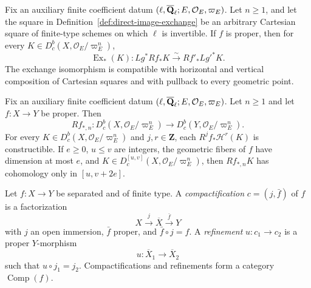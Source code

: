 
\begin{proposition}
\label{prop:finite-proper-base-change}


Fix an auxiliary finite coefficient datum
\((\ell,\overline{\mathbf Q}_\ell;E,\mathcal O_E,\varpi_E)\).  Let \(n\geq1\), and let the square in
Definition~\ref{def:direct-image-exchange} be an arbitrary Cartesian
square of finite-type schemes on which \(\ell\) is invertible.  If \(f\) is
proper, then for every
\(K\in D^b_c(X,\mathcal O_E/\varpi_E^n)\),
\[
 \operatorname{Ex}_*(K):Lg^*Rf_*K\xrightarrow{\sim}Rf'_*Lg'^*K.
\]
The exchange isomorphism is compatible with horizontal and vertical
composition of Cartesian squares and with pullback to every geometric
point.
\end{proposition}


\begin{proposition}
\label{prop:finite-proper-direct-image}


Fix an auxiliary finite coefficient datum
\((\ell,\overline{\mathbf Q}_\ell;E,\mathcal O_E,\varpi_E)\).  Let \(n\geq1\) and let
\(f:X\to Y\) be proper.  Then
\[
 Rf_{*,n}:D^b_c(X,\mathcal O_E/\varpi_E^n)
 \longrightarrow D^b_c(Y,\mathcal O_E/\varpi_E^n).
\]
For every \(K\in D^b_c(X,\mathcal O_E/\varpi_E^n)\) and
\(j,r\in\mathbf Z\), each \(R^jf_*\mathcal H^r(K)\) is constructible.  If
\(e\geq0\), \(u\leq v\) are integers, the geometric fibers of \(f\) have
dimension at most \(e\), and
\(K\in D_c^{[u,v]}(X,\mathcal O_E/\varpi_E^n)\), then
\(Rf_{*,n}K\) has cohomology only in \([u,v+2e]\).
\end{proposition}


\begin{definition}
\label{def:compactification-category}


Let \(f:X\to Y\) be separated and of finite type.  A
\emph{compactification} \(c=(j,\bar f)\) of \(f\) is a factorization
\[
 X\xrightarrow{j}\overline X\xrightarrow{\bar f}Y
\]
with \(j\) an open immersion, \(\bar f\) proper, and
\(\bar f\circ j=f\).  A \emph{refinement}
\(u:c_1\to c_2\) is a proper \(Y\)-morphism
\[
 u:\overline X_1\longrightarrow\overline X_2
\]
such that \(u\circ j_1=j_2\).  Compactifications and refinements form a
category \(\operatorname{Comp}(f)\).
\end{definition}

